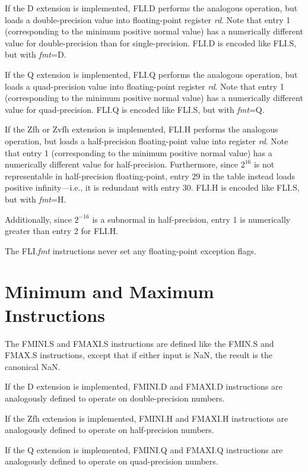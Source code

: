 If the D extension is implemented, FLI.D performs the analogous operation,
but loads a double-precision value into floating-point register {\em rd}.
Note that entry 1 (corresponding to the minimum positive normal value) has a
numerically different value for double-precision than for single-precision.
FLI.D is encoded like FLI.S, but with {\em fmt}=D.

If the Q extension is implemented, FLI.Q performs the analogous operation,
but loads a quad-precision value into floating-point register {\em rd}.
Note that entry 1 (corresponding to the minimum positive normal value) has a
numerically different value for quad-precision.
FLI.Q is encoded like FLI.S, but with {\em fmt}=Q.

If the Zfh or Zvfh extension is implemented, FLI.H performs the analogous
operation, but loads a half-precision floating-point value into register
{\em rd}.
Note that entry 1 (corresponding to the minimum positive normal value) has a
numerically different value for half-precision.
Furthermore,
since $2^{16}$ is not representable in half-precision floating-point, entry 29
in the table instead loads positive infinity---i.e., it is redundant
with entry 30.
FLI.H is encoded like FLI.S, but with {\em fmt}=H.

\begin{commentary}
Additionally, since $2^{-16}$ is a subnormal in half-precision, entry 1 is numerically
greater than entry 2 for FLI.H.
\end{commentary}

The FLI.{\em fmt} instructions never set any floating-point exception flags.


\section{Minimum and Maximum Instructions}

The FMINI.S and FMAXI.S instructions are defined like the FMIN.S and FMAX.S
instructions, except that if either input is NaN, the result is the
canonical NaN.

If the D extension is implemented, FMINI.D and FMAXI.D instructions are
analogously defined to operate on double-precision numbers.

If the Zfh extension is implemented, FMINI.H and FMAXI.H instructions are
analogously defined to operate on half-precision numbers.

If the Q extension is implemented, FMINI.Q and FMAXI.Q instructions are
analogously defined to operate on quad-precision numbers.

